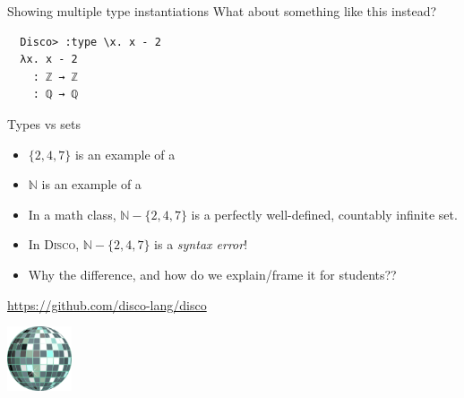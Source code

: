 \documentclass[fleqn,xcolor={usenames,dvipsnames,svgnames,table},12pt,aspectratio=169]{beamer}
\newenvironment{xframe}[1][]
  {\begin{frame}[fragile,environment=xframe,#1]}
  {\end{frame}}
\newcommand{\disco}{\textsc{Disco}\xspace}
\newcommand{\N}{\mathbb{N}}
\begin{document}
\begin{xframe}{Showing multiple type instantiations}
  What about something like this instead?
  \begin{verbatim}
  Disco> :type \x. x - 2
  λx. x - 2
    : ℤ → ℤ
    : ℚ → ℚ
  \end{verbatim}
\end{xframe}

\begin{xframe}{Types vs sets}
  \begin{itemize}
  \item<+-> $\{2,4,7\}$ is an example of a \underline{\hspace{2in}}
  \item<+-> $\N$ is an example of a \underline{\hspace{2in}}
  \item<+-> In a math class, $\N - \{2,4,7\}$ is a perfectly well-defined,
  countably infinite set.
  \item<+-> In \disco, $\N - \{2,4,7\}$ is a \emph{syntax error}!
  \item<+-> Why the difference, and how do we explain/frame it for
    students??
  \end{itemize}
  \bigskip
\end{xframe}

\begin{xframe}
  \begin{center}
  \url{https://github.com/disco-lang/disco}
  \bigskip

  \includegraphics[width=0.75in]{logo.png}
  \end{center}
\end{xframe}
\end{document}
